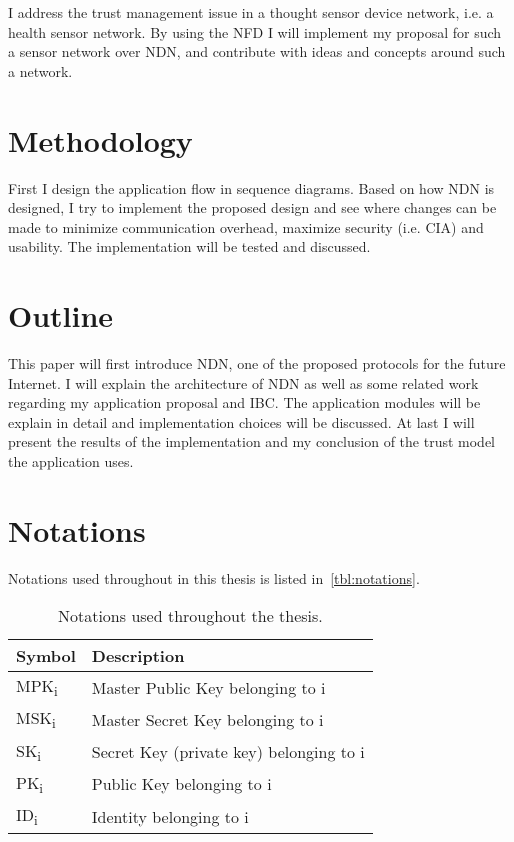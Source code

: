 I address the trust management issue in a thought sensor device network, i.e. a health sensor network.
By using the \gls{NFD} I will implement my proposal for such a sensor network over \gls{NDN}, and contribute with ideas and concepts around such a network.

\section{Methodology}

First I design the application flow in sequence diagrams.
Based on how \gls{NDN} is designed, I try to implement the proposed design and see where changes can be made to minimize communication overhead, maximize security (i.e. \gls{CIA}) and usability.
The implementation will be tested and discussed.

\section{Outline}

This paper will first introduce \gls{NDN}, one of the proposed protocols for the future Internet.
I will explain the architecture of \gls{NDN} as well as some related work regarding my application proposal and \gls{IBC}. 
The application modules will be explain in detail and implementation choices will be discussed.
At last I will present the results of the implementation and my conclusion of the trust model the application uses.

\section{Notations}
Notations used throughout in this thesis is listed in~\autoref{tbl:notations}.
\begin{table}[h]
  \begin{tabular}[c]{p{}p{}}
  \hline
  Symbol                    & Description                               \\ \hline
  MPK\textsubscript{i}      & Master Public Key belonging to i          \\ %
  MSK\textsubscript{i}      & Master Secret Key belonging to i          \\ %
  SK\textsubscript{i}       & Secret Key (private key) belonging to i   \\ %
  PK\textsubscript{i}       & Public Key belonging to i                 \\ %
  ID\textsubscript{i}       & Identity belonging to i                   \\ %
  \end{tabular}
  \caption{Notations used throughout the thesis.}
  \label{tbl:notations}
\end{table}